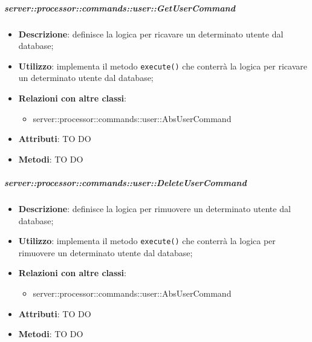         \subparagraph{server::processor::commands::user::GetUserCommand} %
        \label{subp:bdsm_app_server_processor_commands_user_getusercommand}
        \begin{itemize}
          \item \textbf{Descrizione}: definisce la logica per ricavare un determinato utente dal database;
          \item \textbf{Utilizzo}: implementa il metodo \texttt{execute()} che conterrà la logica per ricavare un determinato utente dal database;
          \item \textbf{Relazioni con altre classi}:
            \begin{itemize}
              \item server::processor::commands::user::AbsUserCommand
            \end{itemize}
			\item \textbf{Attributi}: TO DO
			\item \textbf{Metodi}: TO DO
        \end{itemize}

        \subparagraph{server::processor::commands::user::DeleteUserCommand} %
        \label{subp:bdsm_app_server_processor_commands_user_deleteusercommand}
        \begin{itemize}
          \item \textbf{Descrizione}: definisce la logica per rimuovere un determinato utente dal database;
          \item \textbf{Utilizzo}: implementa il metodo \texttt{execute()} che conterrà la logica per rimuovere un determinato utente dal database;
          \item \textbf{Relazioni con altre classi}:
            \begin{itemize}
              \item server::processor::commands::user::AbsUserCommand
            \end{itemize}
			\item \textbf{Attributi}: TO DO
			\item \textbf{Metodi}: TO DO
        \end{itemize}

